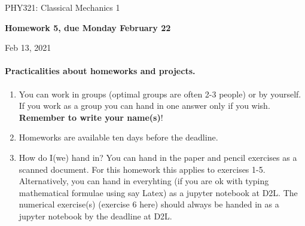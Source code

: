\documentclass[%
oneside,                 %
final,                   %
10pt]{article}
\begin{document}

\newcommand{\exercisesection}[1]{\subsection*{#1}}






\thispagestyle{empty}

\begin{center}
{\LARGE\bf
\begin{spacing}{1.25}
PHY321: Classical Mechanics 1
\end{spacing}
}
\end{center}


\begin{center}
{\bf Homework 5, due Monday  February 22${}^{}$} \\ [0mm]
\end{center}

\begin{center}
\end{center}
    

\begin{center}
Feb 13, 2021
\end{center}

\vspace{1cm}


\paragraph{Practicalities about  homeworks and projects.}
\begin{enumerate}
\item You can work in groups (optimal groups are often 2-3 people) or by yourself. If you work as a group you can hand in one answer only if you wish. \textbf{Remember to write your name(s)}!

\item Homeworks are available ten days before the deadline.

\item How do I(we)  hand in?  You can hand in the paper and pencil exercises as a scanned document. For this homework this applies to exercises 1-5. Alternatively, you can hand in everyhting (if you are ok with typing mathematical formulae using say Latex) as a jupyter notebook at D2L. The numerical exercise(s) (exercise 6 here) should always be handed in as a jupyter notebook by the deadline at D2L. 
\end{enumerate}
\end{document}
